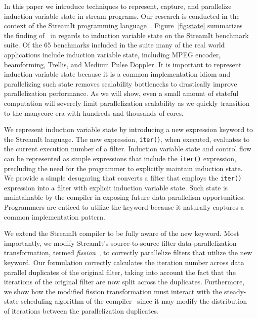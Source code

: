  
In this paper we introduce techniques to represent, capture, and
parallelize induction variable state in stream programs. Our research
is conducted in the context of the StreamIt programming
language~\cite{streamitcc}.  Figure~\ref{fig:state} summarizes the
finding of~\cite{streamit-suite} in regards to induction variable
state on the StreamIt benchmark suite.  Of the 65 benchmarks included
in the suite many of the real world applications include induction
variable state, including MPEG encoder, beamforming, Trellis, and Medium
Pulse Doppler.
It is important to represent induction variable state because it is a
common implementation idiom and parallelizing such state removes
scalability bottlenecks to drastically improve parallelization
performance. As we will show, even a small amount of stateful
computation will severely limit parallelization scalability as we
quickly transition to the manycore era with hundreds and thousands of
cores.

We represent induction variable state by introducing a new expression
keyword to the StreamIt language. The new expression, {\tt iter()},
when executed, evaluates to the current execution number of a filter.
Induction variable state and control flow can be represented as simple
expressions that include the {\tt iter()} expression, precluding the
need for the programmer to explicitly maintain induction state. We
provide a simple desugaring that converts a filter that employs the
{\tt iter()} expression into a filter with explicit induction
variable state.  Such state is maintainable by the compiler in 
exposing future data parallelism opportunities.
Programmers are enticed to utilize the keyword because it naturally
captures a common implementation pattern.

We extend the StreamIt compiler to be fully aware of the new keyword.
Most importantly, we modify StreamIt's source-to-source filter 
data-parallelization transformation, termed {\it
  fission}~\cite{streamit-asplos}, to correctly parallelize filters
that utilize the new keyword. Our formulation correctly calculates the
iteration number across data parallel duplicates of the original
filter, taking into account the fact that the iterations of the original
filter are now split across the duplicates. Furthermore, we show how
the modified fission transformation must interact with the
steady-state scheduling algorithm of the
compiler~\cite{karczmarek-lctes03} since it may modify the
distribution of iterations between the parallelization duplicates.

